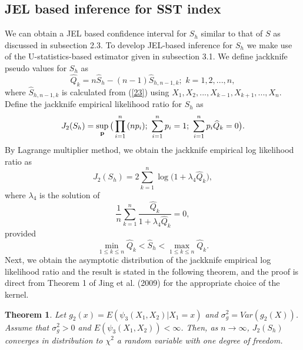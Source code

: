 \documentclass[11pt]{article}
\newtheorem{theorem}{Theorem}
\begin{document}
 \subsection{JEL based inference for SST index}
We can obtain a JEL based confidence interval for $S_h$  similar to that of $S$ as discussed in subsection 2.3.
To develop JEL-based inference for $S_h$ we make use of the U-statistics-based estimator given  in subsection 3.1.  We define jackknife pseudo values for $S_{h}$ as
  \begin{equation*}
    \widehat{Q}_{k}=n\widehat{S}_h-(n-1)\widehat{S}_{h,n-1,k};\,\,k=1,2,...,n,
  \end{equation*}
  where $\widehat{S}_{h,n-1,k}$ is calculated from (\ref{23}) using $X_1,X_2,...,X_{k-1},X_{k+1},...,X_{n}$.
  Define the jackknife empirical likelihood ratio  for $S_{h}$  as
  \begin{equation*}
 J_2(S_h)=\sup_{\bf p} \big(\prod_{i=1}^{n}{(np_i)};\,\, \sum_{i=1}^{n}{p_i}=1;\,\,\sum_{i=1}^{n}{p_i \widehat{Q}_{k}}=0\big).
\end{equation*}
By Lagrange multiplier method, we obtain the jackknife empirical log likelihood ratio  as
\begin{equation*}
  J_2(S_h)=2\sum_{k=1}^{n}\log\big(1+\lambda_{4}\widehat{Q}_{k}\big),
\end{equation*}
where $\lambda_{4}$ is the solution of
   $$\frac{1}{n}\sum_{k=1}^{n}{\frac{\widehat{Q}_{k}}{1+\lambda_{4} \widehat{Q}_{k}}}=0,$$
    provided
\begin{equation}\label{lamb11}
  \min_{{1\le k\le n}}\widehat{Q}_{k}<\widehat{S}_h<  \max_{1\le k\le n}\widehat{Q}_{k}.
\end{equation}Next, we obtain the asymptotic distribution of the jackknife empirical log likelihood ratio and the result is stated in the following theorem, and the proof is direct from Theorem 1 of Jing et al. (2009) for the appropriate choice of the kernel.
   \begin{theorem}\label{thm:sstjel} Let $g_2(x)=E\left(\psi_3(X_1,X_2)|X_1=x\right)$ and $\sigma_{g}^{2}=Var(g_2(X))$.
  Assume that   $\sigma_{g}^{2}>0$ and $E\left(\psi_3(X_1,X_2)\right)<\infty$.  Then, as $n\rightarrow \infty$, $J_2(S_h)$ converges in distribution to $\chi^2$ a random variable with one degree of freedom.
\end{theorem}
\end{document}
